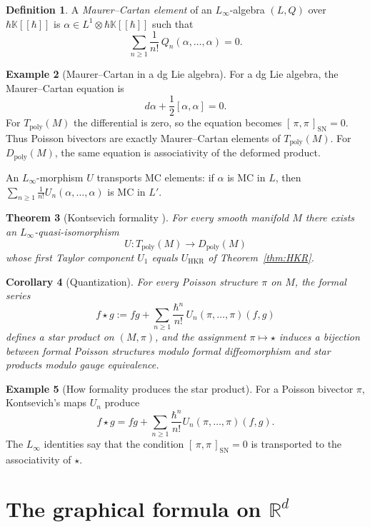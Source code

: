 \documentclass[11pt,a4paper]{article}
\newtheorem{theorem}{Theorem}[section]
\newtheorem{corollary}[theorem]{Corollary}
\theoremstyle{definition}
\newtheorem{definition}[theorem]{Definition}
\newtheorem{example}[theorem]{Example}
\newcommand{\R}{\mathbb{R}}
\newcommand{\K}{\mathbb{K}}
\newcommand{\Tpoly}{T_{\mathrm{poly}}}
\newcommand{\Dpoly}{D_{\mathrm{poly}}}
\newcommand{\Sch}[2]{[\,#1,#2\,]_{\mathrm{SN}}}
\newcommand{\defi}[1]{\emph{#1}}
\begin{document}
\begin{definition}\label{def:MC}
A \defi{Maurer--Cartan element} of an $L_\infty$-algebra $(L, Q)$ over
$\hbar \K[[\hbar]]$ is $\alpha \in L^{1} \otimes \hbar \K[[\hbar]]$ such
that
\[
\sum_{n \ge 1} \frac{1}{n!}\, Q_{n}(\alpha, \dots, \alpha) = 0.
\]
\end{definition}

\begin{example}[Maurer--Cartan in a dg Lie algebra]
\label{ex:mc-dgla}
For a dg Lie algebra, the Maurer--Cartan equation is
\[
d\alpha+\frac12[\alpha,\alpha]=0.
\]
For $\Tpoly(M)$ the differential is zero, so the equation becomes
$\Sch{\pi}{\pi}=0$. Thus Poisson bivectors are exactly
Maurer--Cartan elements of $\Tpoly(M)$. For $\Dpoly(M)$, the same
equation is associativity of the deformed product.
\end{example}

An $L_\infty$-morphism $U$ transports MC elements: if $\alpha$ is MC in
$L$, then $\sum_{n \ge 1} \tfrac{1}{n!} U_{n}(\alpha, \dots, \alpha)$
is MC in $L'$.

\begin{theorem}[Kontsevich formality {\cite[Thm.~6.4]{Kontsevich2003}}]
\label{thm:formality}
For every smooth manifold $M$ there exists an $L_\infty$-quasi-isomorphism
\[
U \colon \Tpoly(M) \longrightarrow \Dpoly(M)
\]
whose first Taylor component $U_{1}$ equals $U_{\mathrm{HKR}}$ of
Theorem~\ref{thm:HKR}.
\end{theorem}

\begin{corollary}[Quantization]\label{cor:quantization}
For every Poisson structure $\pi$ on $M$, the formal series
\[
f \star g := fg + \sum_{n \ge 1} \frac{\hbar^{n}}{n!}\,
U_{n}(\pi, \dots, \pi)(f, g)
\]
defines a star product on $(M, \pi)$, and the assignment
$\pi \mapsto \star$ induces a bijection between formal Poisson
structures modulo formal diffeomorphism and star products modulo gauge
equivalence.
\end{corollary}

\begin{example}[How formality produces the star product]
\label{ex:formality-star}
For a Poisson bivector $\pi$, Kontsevich's maps $U_n$ produce
\[
f\star g
=fg+\sum_{n\ge1}\frac{\hbar^n}{n!}U_n(\pi,\dots,\pi)(f,g).
\]
The $L_\infty$ identities say that the condition
$\Sch{\pi}{\pi}=0$ is transported to the associativity of $\star$.
\end{example}

\section{The graphical formula on \texorpdfstring{$\R^{d}$}{R\^d}}
\label{sec:graphs}
\end{document}
